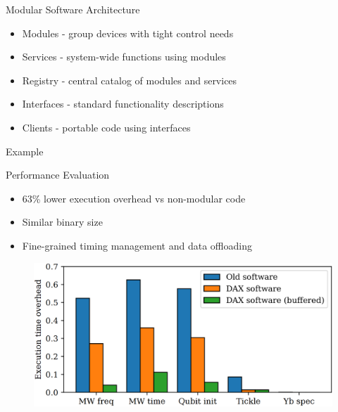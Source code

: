 \documentclass[18 pt]{beamer}
\begin{document}
\begin{frame}{Modular Software Architecture}
\begin{itemize}
\item Modules - group devices with tight control needs
\item Services - system-wide functions using modules
\item Registry - central catalog of modules and services
\item Interfaces - standard functionality descriptions
\item Clients - portable code using interfaces
\end{itemize}
\end{frame}
\begin{frame}{Example}
  \begin{figure}
  \end{figure}
\end{frame}
\begin{frame}{Performance Evaluation}
\begin{itemize}
\item 63\% lower execution overhead vs non-modular code
\item Similar binary size
\item Fine-grained timing management and data offloading
\end{itemize}
\end{frame}
\begin{frame}
  \begin{figure}
    \includegraphics[width=.8\textwidth]{time.png}
  \end{figure}
\end{frame}
\end{document}

